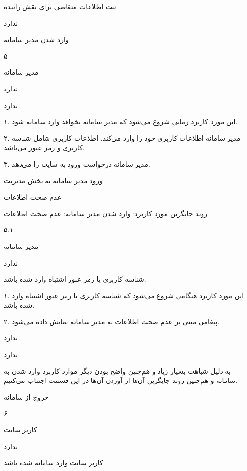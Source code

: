 ثبت اطلاعات متقاضی برای نقش راننده

ندارد

\noindent \hrulefill

وارد شدن مدیر سامانه

۵

مدیر سامانه

ندارد

ندارد


۱. این مورد کاربرد زمانی شروع می‌شود که مدیر سامانه بخواهد وارد سامانه شود.

۲. مدیر سامانه اطلاعات کاربری خود را وارد می‌کند. اطلاعات کاربری شامل شناسه کاربری و رمز عبور می‌باشد.

۳. مدیر سامانه درخواست ورود به سایت را می‌دهد.

ورود مدیر سامانه به بخش مدیریت

عدم صحت اطلاعات

\noindent \hrulefill

روند جایگزین مورد کاربرد: وارد شدن مدیر سامانه: عدم صحت اطلاعات

۵.۱

مدیر سامانه

ندارد

شناسه کاربری یا رمز عبور اشتباه وارد شده باشد.


۱. این مورد کاربرد هنگامی شروع می‌شود که شناسه کاربری یا رمز عبور اشتباه وارد شده باشد.

۲. پیغامی مبنی بر عدم صحت اطلاعات به مدیر سامانه نمایش داده می‌شود.

ندارد

ندارد

 به دلیل شباهت بسیار زیاد و هم‌چنین واضح بودن دیگر موارد کاربرد وارد شدن به سامانه و هم‌چنین روند جایگزین آن‌ها از آوردن آن‌ها در این قسمت اجتناب می‌کنیم.

\noindent \hrulefill

خروج از سامانه

۶

کاربر سایت

ندارد

کاربر سایت وارد سامانه شده باشد

